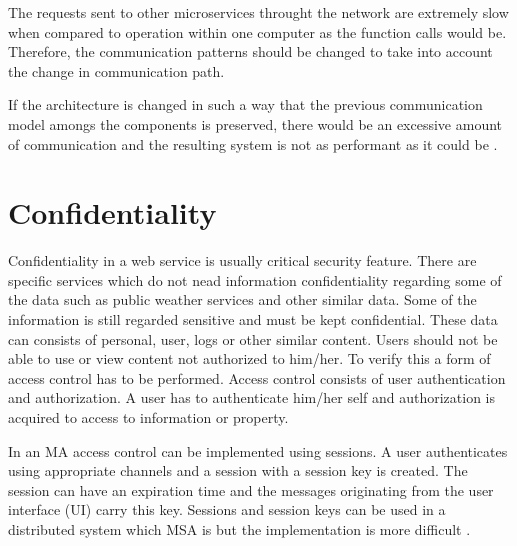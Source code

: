 \begin{sloppypar}
\begin{sloppypar}
\end{sloppypar}
\begin{sloppypar}
    The requests sent to other microservices throught the network are extremely 
    slow when compared to operation within one computer as the function calls 
    would be. Therefore, the communication patterns should be changed to take 
    into account the change in communication path.
\end{sloppypar}
\begin{sloppypar}
    If the architecture is changed in such a way that the previous communication 
    model amongs the components is preserved, there would be an excessive amount 
    of communication and the resulting system is not as performant as it could 
    be \citep{fowlerlewisms}.
\end{sloppypar}




\section{Confidentiality}
\begin{sloppypar}
    Confidentiality in a web service is usually critical security feature. 
    There are specific services which do not nead information confidentiality 
    regarding some of the data such as public weather services and other similar data.
    Some of the information is still regarded sensitive and must be kept confidential. 
    These data can consists of personal, user, logs or other similar content.
    Users should not be able to use or view content not authorized to him/her. 
    To verify this a form of access control has to be performed. Access control 
    consists of user authentication and authorization. A user has to 
    authenticate him/her self and authorization is acquired to access to 
    information or property.
\end{sloppypar}
\begin{sloppypar}
    In an MA access control can be implemented using sessions. 
    A user authenticates using appropriate channels and a session with a session key is created. 
    The session can have an expiration time and the messages originating from 
    the user interface (UI) carry this key. Sessions and session keys can be used 
    in a distributed system which MSA is but the implementation is more difficult \citep{authinmsa}.
\end{sloppypar}


\end{sloppypar}
